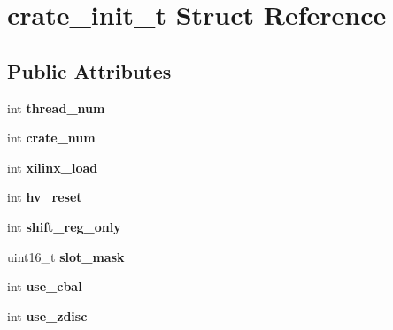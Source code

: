 \hypertarget{structcrate__init__t}{
\section{crate\_\-init\_\-t Struct Reference}
\label{structcrate__init__t}
}
\subsection*{Public Attributes}
\begin{DoxyCompactItemize}
\item 
\hypertarget{structcrate__init__t_a3f157b438354fb316107ccee1b21183a}{
int {\bfseries thread\_\-num}}
\label{structcrate__init__t_a3f157b438354fb316107ccee1b21183a}

\item 
\hypertarget{structcrate__init__t_ad4c1d206ec3cc6e9b32098baee386ae4}{
int {\bfseries crate\_\-num}}
\label{structcrate__init__t_ad4c1d206ec3cc6e9b32098baee386ae4}

\item 
\hypertarget{structcrate__init__t_a64f059abcad3e21b796a5a384643fc0a}{
int {\bfseries xilinx\_\-load}}
\label{structcrate__init__t_a64f059abcad3e21b796a5a384643fc0a}

\item 
\hypertarget{structcrate__init__t_a5f211573f0ff01f908de1a8c71b31462}{
int {\bfseries hv\_\-reset}}
\label{structcrate__init__t_a5f211573f0ff01f908de1a8c71b31462}

\item 
\hypertarget{structcrate__init__t_a56ad203d7fc9accb7974a78f4fd9ec12}{
int {\bfseries shift\_\-reg\_\-only}}
\label{structcrate__init__t_a56ad203d7fc9accb7974a78f4fd9ec12}

\item 
\hypertarget{structcrate__init__t_a5c898ff7cf877e7200806a430806f72f}{
uint16\_\-t {\bfseries slot\_\-mask}}
\label{structcrate__init__t_a5c898ff7cf877e7200806a430806f72f}

\item 
\hypertarget{structcrate__init__t_a928bda9bcd269523b6db2bf782173ba7}{
int {\bfseries use\_\-cbal}}
\label{structcrate__init__t_a928bda9bcd269523b6db2bf782173ba7}

\item 
\hypertarget{structcrate__init__t_a691c31e6d7fb3d674b5c58ead3789a6f}{
int {\bfseries use\_\-zdisc}}
\label{structcrate__init__t_a691c31e6d7fb3d674b5c58ead3789a6f}


\end{DoxyCompactItemize}
